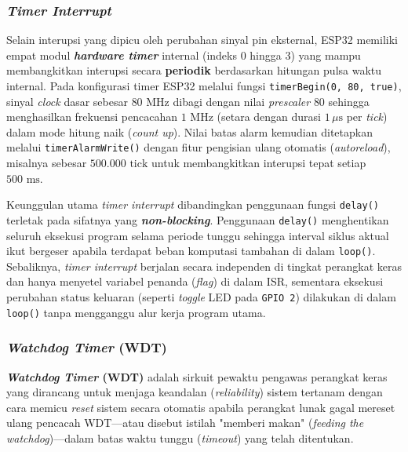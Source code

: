 \subsubsection{\textit{Timer Interrupt}}
Selain interupsi yang dipicu oleh perubahan sinyal pin eksternal, ESP32 memiliki empat modul \textbf{\textit{hardware timer}} internal (indeks 0 hingga 3) yang mampu membangkitkan interupsi secara \textbf{periodik} berdasarkan hitungan pulsa waktu internal. Pada konfigurasi timer ESP32 melalui fungsi \texttt{timerBegin(0, 80, true)}, sinyal \textit{clock} dasar sebesar $80\text{ MHz}$ dibagi dengan nilai \textit{prescaler} $80$ sehingga menghasilkan frekuensi pencacahan $1\text{ MHz}$ (setara dengan durasi $1\,\mu\text{s}$ per \textit{tick}) dalam mode hitung naik (\textit{count up}). Nilai batas alarm kemudian ditetapkan melalui \texttt{timerAlarmWrite()} dengan fitur pengisian ulang otomatis (\textit{autoreload}), misalnya sebesar $500.000\text{ tick}$ untuk membangkitkan interupsi tepat setiap $500\text{ ms}$.

Keunggulan utama \textit{timer interrupt} dibandingkan penggunaan fungsi \texttt{delay()} terletak pada sifatnya yang \textbf{\textit{non-blocking}}. Penggunaan \texttt{delay()} menghentikan seluruh eksekusi program selama periode tunggu sehingga interval siklus aktual ikut bergeser apabila terdapat beban komputasi tambahan di dalam \texttt{loop()}. Sebaliknya, \textit{timer interrupt} berjalan secara independen di tingkat perangkat keras dan hanya menyetel variabel penanda (\textit{flag}) di dalam ISR, sementara eksekusi perubahan status keluaran (seperti \textit{toggle} LED pada \texttt{GPIO 2}) dilakukan di dalam \texttt{loop()} tanpa mengganggu alur kerja program utama.

\subsubsection{\textit{Watchdog Timer} (WDT)}
\textbf{\textit{Watchdog Timer} (WDT)} adalah sirkuit pewaktu pengawas perangkat keras yang dirancang untuk menjaga keandalan (\textit{reliability}) sistem tertanam dengan cara memicu \textit{reset} sistem secara otomatis apabila perangkat lunak gagal mereset ulang pencacah WDT—atau disebut istilah "memberi makan" (\textit{feeding the watchdog})—dalam batas waktu tunggu (\textit{timeout}) yang telah ditentukan.

